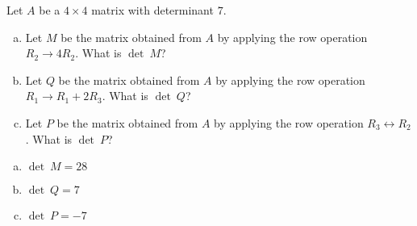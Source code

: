 
\begin{exerciseStatement}


Let \(A\) be a \(4 \times 4\) matrix with determinant \( 7 \).


\begin{enumerate}[(a)]
\item Let \(M\) be the matrix obtained from \(A\) by applying the row operation \( R_2 \to 4R_2 \). What is \(\operatorname{det}\ M\)?
\item Let \(Q\) be the matrix obtained from \(A\) by applying the row operation \( R_1 \to R_1 + 2R_3 \). What is \(\operatorname{det}\ Q\)?
\item Let \(P\) be the matrix obtained from \(A\) by applying the row operation \( R_3 \leftrightarrow R_2 \). What is \(\operatorname{det}\ P\)?
\end{enumerate}
    
\end{exerciseStatement}
    
\begin{exerciseAnswer} 

\begin{enumerate}[(a)]
\item \(\operatorname{det}\ M= 28 \)
\item \(\operatorname{det}\ Q= 7 \)
\item \(\operatorname{det}\ P= -7 \)
\end{enumerate}
    
\end{exerciseAnswer}
    
